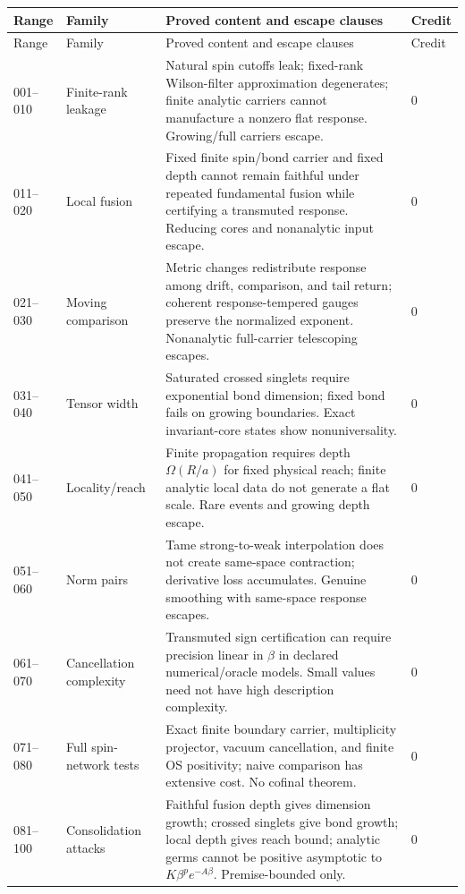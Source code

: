 \documentclass[11pt,oneside]{report}
\theoremstyle{definition}
\theoremstyle{remark}
\begin{document}
\small
\begin{longtable}{p{}p{}p{}p{}}
\toprule Range & Family & Proved content and escape clauses & Credit \\
\midrule\endfirsthead\toprule Range & Family & Proved content and escape clauses & Credit \\
\midrule\endhead
001--010 & Finite-rank leakage & Natural spin cutoffs leak; fixed-rank Wilson-filter approximation degenerates; finite analytic carriers cannot manufacture a nonzero flat response. Growing/full carriers escape. & 0 \\
011--020 & Local fusion & Fixed finite spin/bond carrier and fixed depth cannot remain faithful under repeated fundamental fusion while certifying a transmuted response. Reducing cores and nonanalytic input escape. & 0 \\
021--030 & Moving comparison & Metric changes redistribute response among drift, comparison, and tail return; coherent response-tempered gauges preserve the normalized exponent. Nonanalytic full-carrier telescoping escapes. & 0 \\
031--040 & Tensor width & Saturated crossed singlets require exponential bond dimension; fixed bond fails on growing boundaries. Exact invariant-core states show nonuniversality. & 0 \\
041--050 & Locality/reach & Finite propagation requires depth $\Omega(R/a)$ for fixed physical reach; finite analytic local data do not generate a flat scale. Rare events and growing depth escape. & 0 \\
051--060 & Norm pairs & Tame strong-to-weak interpolation does not create same-space contraction; derivative loss accumulates. Genuine smoothing with same-space response escapes. & 0 \\
061--070 & Cancellation complexity & Transmuted sign certification can require precision linear in $\beta$ in declared numerical/oracle models. Small values need not have high description complexity. & 0 \\
071--080 & Full spin-network tests & Exact finite boundary carrier, multiplicity projector, vacuum cancellation, and finite OS positivity; naive comparison has extensive cost. No cofinal theorem. & 0 \\
081--100 & Consolidation attacks & Faithful fusion depth gives dimension growth; crossed singlets give bond growth; local depth gives reach bound; analytic germs cannot be positive asymptotic to $K\beta^pe^{-A\beta}$. Premise-bounded only. & 0 \\

\end{longtable}
\end{document}
